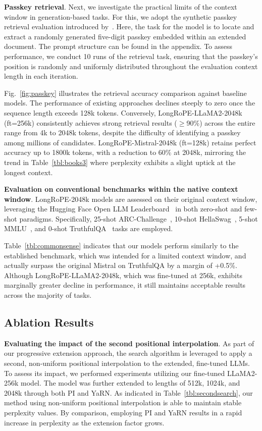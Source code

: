 \textbf{Passkey retrieval}. Next, we investigate the practical limits of the context window in generation-based tasks. For this, we adopt the synthetic passkey retrieval evaluation introduced by~\cite{passkey}. Here, the task for the model is to locate and extract a randomly generated five-digit passkey embedded within an extended document. The prompt structure can be found in the appendix. To assess performance, we conduct 10 runs of the retrieval task, ensuring that the passkey's position is randomly and uniformly distributed throughout the evaluation context length in each iteration.

Fig.~\ref{fig:passkey} illustrates the retrieval accuracy comparison against baseline models. The performance of existing approaches declines steeply to zero once the sequence length exceeds 128k tokens. Conversely, LongRoPE-LLaMA2-2048k (ft=256k) consistently achieves strong retrieval results ($\ge$90\%) across the entire range from 4k to 2048k tokens, despite the difficulty of identifying a passkey among millions of candidates. LongRoPE-Mistral-2048k (ft=128k) retains perfect accuracy up to 1800k tokens, with a reduction to 60\% at 2048k, mirroring the trend in Table~\ref{tbl:books3} where perplexity exhibits a slight uptick at the longest context.

\textbf{Evaluation on conventional benchmarks within the native context window}. LongRoPE-2048k models are assessed on their original context window, leveraging the Hugging Face Open LLM Leaderboard~\cite{huggingfaceboard} in both zero-shot and few-shot paradigms. Specifically, 25-shot ARC-Challenge~\cite{allenai:arc}, 10-shot HellaSwag~\cite{zellers2019hellaswag}, 5-shot MMLU~\cite{mmlu}, and 0-shot TruthfulQA~\cite{lin2021truthfulqa} tasks are employed.

Table~\ref{tbl:commonsense} indicates that our models perform similarly to the established benchmark, which was intended for a limited context window, and actually surpass the original Mistral on TruthfulQA by a margin of +0.5\%. Although LongRoPE-LLaMA2-2048k, which was fine-tuned at 256k, exhibits marginally greater decline in performance, it still maintains acceptable results across the majority of tasks.

\subsection{Ablation Results}

\textbf{Evaluating the impact of the second positional interpolation}. As part of our progressive extension approach, the search algorithm is leveraged to apply a second, non-uniform positional interpolation to the extended, fine-tuned LLMs. To assess its impact, we performed experiments utilizing our fine-tuned LLaMA2-256k model. The model was further extended to lengths of 512k, 1024k, and 2048k through both PI and YaRN. As indicated in Table~\ref{tbl:secondsearch}, our method using non-uniform positional interpolation is able to maintain stable perplexity values. By comparison, employing PI and YaRN results in a rapid increase in perplexity as the extension factor grows.

